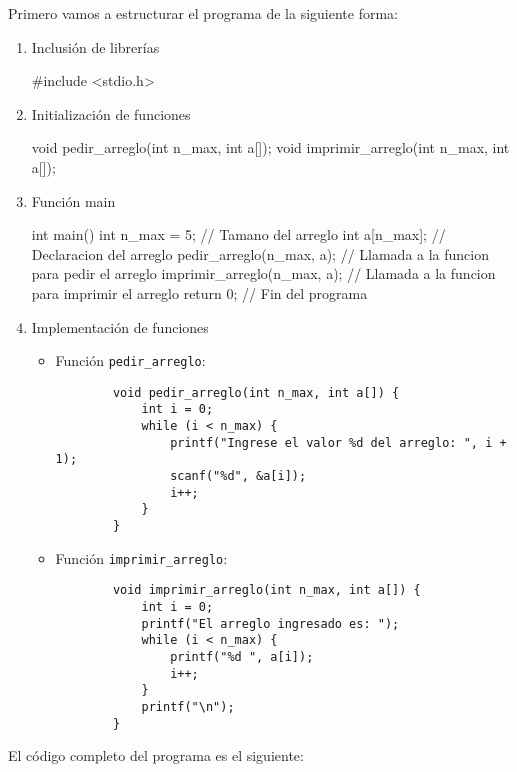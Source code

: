 \documentclass{article}
\begin{document}
Primero vamos a estructurar el programa de la siguiente forma:
\begin{enumerate}
    \item Inclusión de librerías
    \begin{c_code}
    #include <stdio.h>
    \end{c_code}
    \item Initialización de funciones
    \begin{c_code}
    void pedir_arreglo(int n_max, int a[]);
    void imprimir_arreglo(int n_max, int a[]);
    \end{c_code}
    \item Función main
    \begin{c_code}
    int main() {
        int n_max = 5; // Tamano del arreglo
        int a[n_max]; // Declaracion del arreglo
        pedir_arreglo(n_max, a); // Llamada a la funcion para pedir el arreglo
        imprimir_arreglo(n_max, a); // Llamada a la funcion para imprimir el arreglo
        return 0; // Fin del programa
    }
    \end{c_code}
    \item Implementación de funciones
    \begin{itemize}
        \item Función \texttt{pedir\_arreglo}:
        \begin{verbatim}
        void pedir_arreglo(int n_max, int a[]) {
            int i = 0;
            while (i < n_max) {
                printf("Ingrese el valor %d del arreglo: ", i + 1);
                scanf("%d", &a[i]);
                i++;
            }
        }
        \end{verbatim}
        \newpage
        \item Función \texttt{imprimir\_arreglo}:
        \begin{verbatim}
        void imprimir_arreglo(int n_max, int a[]) {
            int i = 0;
            printf("El arreglo ingresado es: ");
            while (i < n_max) {
                printf("%d ", a[i]);
                i++;
            }
            printf("\n");
        }
        \end{verbatim}
    \end{itemize}
\end{enumerate}
El código completo del programa es el siguiente:
\end{document}
